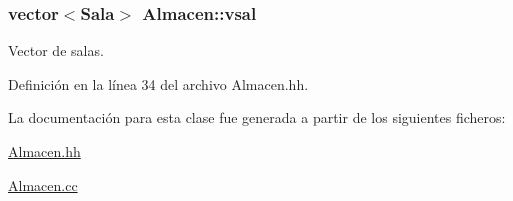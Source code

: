 \subsubsection[{\texorpdfstring{vsal}{vsal}}]{\setlength{\rightskip}{0pt plus 5cm}vector$<${\bf Sala}$>$ Almacen\+::vsal\hspace{0.3cm}{\ttfamily [private]}}\hypertarget{class_almacen_acae00c6ee986edf2a66b07987896b495}{}\label{class_almacen_acae00c6ee986edf2a66b07987896b495}


Vector de salas. 



Definición en la línea 34 del archivo Almacen.\+hh.



La documentación para esta clase fue generada a partir de los siguientes ficheros\+:\begin{DoxyCompactItemize}
\item 
\hyperlink{_almacen_8hh}{Almacen.\+hh}\item 
\hyperlink{_almacen_8cc}{Almacen.\+cc}\end{DoxyCompactItemize}
